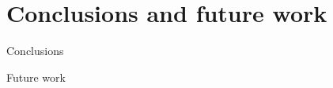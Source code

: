 \documentclass[9pt, pstricks, xcolor=dvipsnames]{beamer}
\begin{document}
\section{Conclusions and future work}
\frame{\insertsection}
\begin{frame}{Conclusions}
    
\end{frame}

\begin{frame}{Future work}
    
\end{frame}
\end{document}

